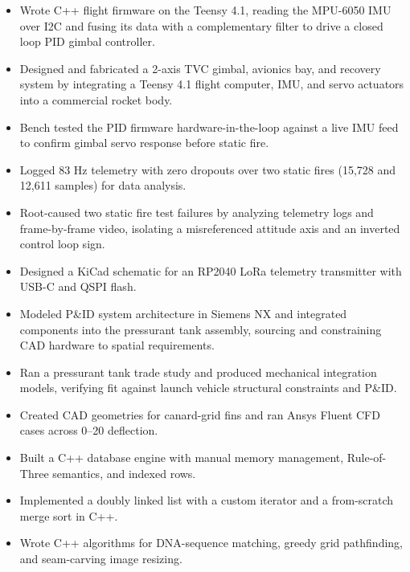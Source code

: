 \begin{itemize}
  \item Wrote C++ flight firmware on the Teensy 4.1, reading the MPU-6050 IMU over I2C and fusing its data with a complementary filter to drive a closed loop PID gimbal controller.
  \item Designed and fabricated a 2-axis TVC gimbal, avionics bay, and recovery system by integrating a Teensy 4.1 flight computer, IMU, and servo actuators into a commercial rocket body.
  \item Bench tested the PID firmware hardware-in-the-loop against a live IMU feed to confirm gimbal servo response before static fire.
  \item Logged 83 Hz telemetry with zero dropouts over two static fires (15,728 and 12,611 samples) for data analysis.
  \item Root-caused two static fire test failures by analyzing telemetry logs and frame-by-frame video, isolating a misreferenced attitude axis and an inverted control loop sign.
\end{itemize}
\entrygap

\begin{itemize}
  \item Designed a KiCad schematic for an RP2040 LoRa telemetry transmitter with USB-C and QSPI flash.
  \item Modeled P\&ID system architecture in Siemens NX and integrated components into the pressurant tank assembly, sourcing and constraining CAD hardware to spatial requirements.
  \item Ran a pressurant tank trade study and produced mechanical integration models, verifying fit against launch vehicle structural constraints and P\&ID.
  \item Created CAD geometries for canard-grid fins and ran Ansys Fluent CFD cases across 0--20\textdegree{} deflection.
\end{itemize}
\entrygap

\begin{itemize}
  \item Built a C++ database engine with manual memory management, Rule-of-Three semantics, and indexed rows.
  \item Implemented a doubly linked list with a custom iterator and a from-scratch merge sort in C++.
  \item Wrote C++ algorithms for DNA-sequence matching, greedy grid pathfinding, and seam-carving image resizing.
\end{itemize}
\entrygap

